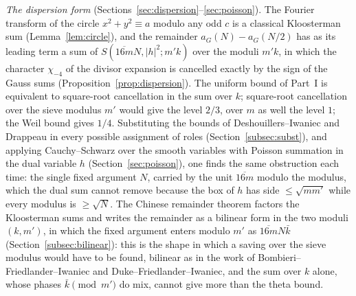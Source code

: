 \documentclass[11pt]{amsart}
\theoremstyle{remark}
\begin{document}
\emph{The dispersion form} (Sections~\ref{sec:dispersion}--\ref{sec:poisson}). The Fourier transform of the circle $x^2+y^2\equiv a$ modulo any odd $c$ is a classical Kloosterman sum (Lemma~\ref{lem:circle}), and the remainder $a_G(N)-a_G(N/2)$ has as its leading term a sum of $S(\overline{16m}N,|h|^2;m'k)$ over the moduli $m'k$, in which the character $\chi_{-4}$ of the divisor expansion is cancelled exactly by the sign of the Gauss sums (Proposition~\ref{prop:dispersion}). The uniform bound of Part~I is equivalent to square-root cancellation in the sum over $k$; square-root cancellation over the sieve modulus $m'$ would give the level $2/3$, over $m$ as well the level $1$; the Weil bound gives $1/4$. Substituting the bounds of Deshouillers--Iwaniec and Drappeau in every possible assignment of roles (Section~\ref{subsec:subst}), and applying Cauchy--Schwarz over the smooth variables with Poisson summation in the dual variable $h$ (Section~\ref{sec:poisson}), one finds the same obstruction each time: the single fixed argument $N$, carried by the unit $\overline{16m}$ modulo the modulus, which the dual sum cannot remove because the box of $h$ has side $\le\sqrt{mm'}$ while every modulus is $\ge\sqrt N$. The Chinese remainder theorem factors the Kloosterman sums and writes the remainder as a bilinear form in the two moduli $(k,m')$, in which the fixed argument enters modulo $m'$ as $\overline{16m}N\bar k$ (Section~\ref{subsec:bilinear}): this is the shape in which a saving over the sieve modulus would have to be found, bilinear as in the work of Bombieri--Friedlander--Iwaniec and Duke--Friedlander--Iwaniec, and the sum over $k$ alone, whose phases $\bar k\pmod{m'}$ do mix, cannot give more than the theta bound.
\end{document}

